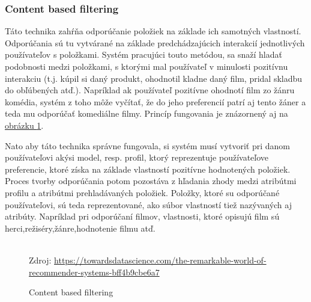 \subsubsection{Content based filtering}
Táto technika zahŕňa odporúčanie položiek na základe ich samotných vlastností. Odporúčania sú tu vytvárané na základe predchádzajúcich interakcií jednotlivých používateľov s položkami. Systém pracujúci touto metódou, sa snaží hladať podobnosti medzi položkami, s ktorými mal používateľ v minulosti pozitívnu interakciu (t.j. kúpil si daný produkt, ohodnotil kladne daný film, pridal skladbu do obľúbených atď.). Napríklad ak používateľ pozitívne ohodnotí film zo žánru komédia, systém z toho môže vyčítať, že do jeho preferencií patrí aj tento žáner a teda mu odporúčať komediálne filmy. Princíp fungovania je znázornený aj na \hyperref[contentFiltering]{obrázku \ref{contentFiltering}}.

Nato aby táto technika správne fungovala, si systém musí vytvoriť pri danom používateľovi akýsi model, resp. profil, ktorý reprezentuje používateľove preferencie, ktoré získa na základe vlastností pozitívne hodnotených položiek. Proces tvorby odporúčania potom pozostáva z hľadania zhody medzi atribútmi profilu a atribútmi prehladávaných položiek. Položky, ktoré su odporúčané používateľovi, sú teda reprezentované, ako súbor vlastností tiež nazývaných aj atribúty. Napríklad pri odporúčaní filmov, vlastnosti, ktoré opisujú film sú herci,režiséry,žánre,hodnotenie filmu atď.\\\\
\begin{figure}[!htbp]
  \centering  
  \def\stackalignment{c}
           {\scriptsize%
            Zdroj: \url{https://towardsdatascience.com/the-remarkable-world-of-recommender-systems-bff4b9cbe6a7}}
  \caption{Content based filtering}
  
  \label{contentFiltering}
\end{figure}

